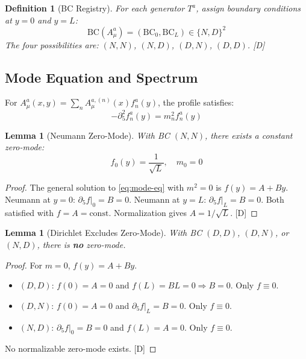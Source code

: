 \documentclass[11pt,a4paper]{article}
\newtheorem{lemma}[theorem]{Lemma}
\newtheorem{definition}[theorem]{Definition}
\newcommand{\tagD}{\textcolor{blue!70!black}{[D]}}
\begin{document}
\begin{definition}[BC Registry]
\label{def:bc-registry}
For each generator $T^a$, assign boundary conditions at $y=0$ and $y=L$:
\begin{equation}
\label{eq:bc-pair}
\text{BC}(A_\mu^a) = (\text{BC}_0, \text{BC}_L) \in \{N, D\}^2
\end{equation}
The four possibilities are: $(N,N)$, $(N,D)$, $(D,N)$, $(D,D)$. \tagD
\end{definition}

\subsection{Mode Equation and Spectrum}

For $A_\mu^a(x,y) = \sum_n A_\mu^{a,(n)}(x) f_n^a(y)$, the profile satisfies:
\begin{equation}
\label{eq:mode-eq}
-\partial_5^2 f_n^a(y) = m_n^2 f_n^a(y)
\end{equation}

\begin{lemma}[Neumann Zero-Mode]
\label{lem:neumann-zero}
With BC $(N,N)$, there exists a constant zero-mode:
\begin{equation}
\label{eq:zero-mode-NN}
f_0(y) = \frac{1}{\sqrt{L}}, \quad m_0 = 0
\end{equation}
\end{lemma}

\begin{proof}
The general solution to \eqref{eq:mode-eq} with $m^2 = 0$ is $f(y) = A + By$.
Neumann at $y=0$: $\partial_5 f|_0 = B = 0$.
Neumann at $y=L$: $\partial_5 f|_L = B = 0$.
Both satisfied with $f = A = \text{const}$. Normalization gives $A = 1/\sqrt{L}$. \tagD
\end{proof}

\begin{lemma}[Dirichlet Excludes Zero-Mode]
\label{lem:dirichlet-no-zero}
With BC $(D,D)$, $(D,N)$, or $(N,D)$, there is \textbf{no} zero-mode.
\end{lemma}

\begin{proof}
For $m = 0$, $f(y) = A + By$.
\begin{itemize}
    \item $(D,D)$: $f(0) = A = 0$ and $f(L) = BL = 0 \Rightarrow B = 0$. Only $f \equiv 0$.
    \item $(D,N)$: $f(0) = A = 0$ and $\partial_5 f|_L = B = 0$. Only $f \equiv 0$.
    \item $(N,D)$: $\partial_5 f|_0 = B = 0$ and $f(L) = A = 0$. Only $f \equiv 0$.
\end{itemize}
No normalizable zero-mode exists. \tagD
\end{proof}
\end{document}
